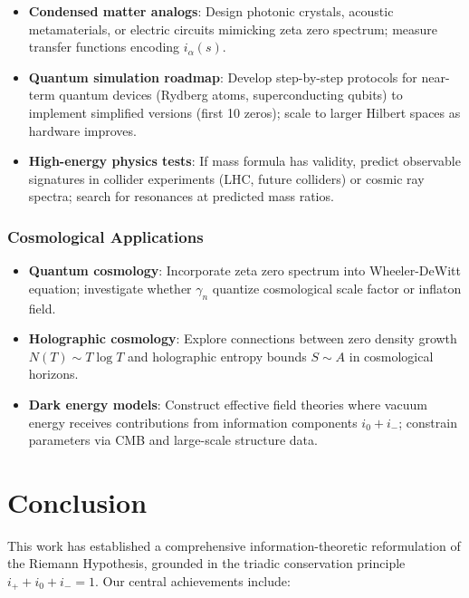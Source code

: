 \documentclass[12pt]{article}
\theoremstyle{plain}
\theoremstyle{definition}
\begin{document}
\begin{itemize}
\item \textbf{Condensed matter analogs}: Design photonic crystals, acoustic metamaterials, or electric circuits mimicking zeta zero spectrum; measure transfer functions encoding $i_\alpha(s)$.

\item \textbf{Quantum simulation roadmap}: Develop step-by-step protocols for near-term quantum devices (Rydberg atoms, superconducting qubits) to implement simplified versions (first 10 zeros); scale to larger Hilbert spaces as hardware improves.

\item \textbf{High-energy physics tests}: If mass formula has validity, predict observable signatures in collider experiments (LHC, future colliders) or cosmic ray spectra; search for resonances at predicted mass ratios.
\end{itemize}

\subsubsection{Cosmological Applications}

\begin{itemize}
\item \textbf{Quantum cosmology}: Incorporate zeta zero spectrum into Wheeler-DeWitt equation; investigate whether $\gamma_n$ quantize cosmological scale factor or inflaton field.

\item \textbf{Holographic cosmology}: Explore connections between zero density growth $N(T) \sim T \log T$ and holographic entropy bounds $S \sim A$ in cosmological horizons.

\item \textbf{Dark energy models}: Construct effective field theories where vacuum energy receives contributions from information components $i_0 + i_-$; constrain parameters via CMB and large-scale structure data.
\end{itemize}

\section{Conclusion}

This work has established a comprehensive information-theoretic reformulation of the Riemann Hypothesis, grounded in the triadic conservation principle $i_+ + i_0 + i_- = 1$. Our central achievements include:
\end{document}
